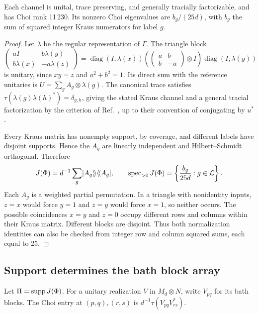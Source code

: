 \begin{proposition}\label{prop:channel}
Each channel is unital, trace preserving, and generally tracially factorizable, and has
Choi rank 11\,230. Its nonzero Choi eigenvalues are $b_g/(25d)$, with $b_g$ the sum of
squared integer Kraus numerators for label $g$.
\end{proposition}
\begin{proof}
Let $\lambda$ be the regular representation of $\Gamma$. The triangle block
\[
 \begin{pmatrix}aI&b\lambda(y)\\b\lambda(x)&-a\lambda(z)\end{pmatrix}
 =\operatorname{diag}(I,\lambda(x))
 \left(\begin{pmatrix}a&b\\b&-a\end{pmatrix}\otimes I\right)
 \operatorname{diag}(I,\lambda(y))
\]
is unitary, since $xy=z$ and $a^2+b^2=1$. Its direct sum with the reference unitaries is
$U=\sum_gA_g\otimes\lambda(g)$. The canonical trace satisfies
$\tau(\lambda(g)\lambda(h)^*)=\delta_{g,h}$, giving the stated Kraus channel and a general
tracial factorization by the criterion of Ref.~\cite[Theorem~2.2]{hm11}, up to their
convention of conjugating by $u^*$.

Every Kraus matrix has nonempty support, by coverage, and different labels have disjoint
supports. Hence the $A_g$ are linearly independent and Hilbert--Schmidt orthogonal. Therefore
\[
 J(\Phi)=d^{-1}\sum_g\lvert A_g\rangle\!\rangle\langle\!\langle A_g\rvert,\qquad
 \operatorname{spec}_{>0}J(\Phi)=\left\{\frac{b_g}{25d}:g\in\mathcal L\right\}.
\]
Each $A_g$ is a weighted partial permutation. In a triangle with nonidentity inputs,
$z=x$ would force $y=1$ and $z=y$ would force $x=1$, so neither occurs. The possible
coincidences $x=y$ and $z=0$ occupy different rows and columns within their Kraus matrix.
Different blocks are disjoint. Thus both normalization identities can also be checked from
integer row and column squared sums, each equal to 25.
\end{proof}

\subsection{Support determines the bath block array}
Let $\Pi=\operatorname{supp} J(\Phi)$. For a unitary realization $V$ in $M_d\otimes N$, write
$V_{pq}$ for its bath blocks. The Choi entry at $(p,q),(r,s)$ is
$d^{-1}\tau(V_{pq}V_{rs}^*)$.


